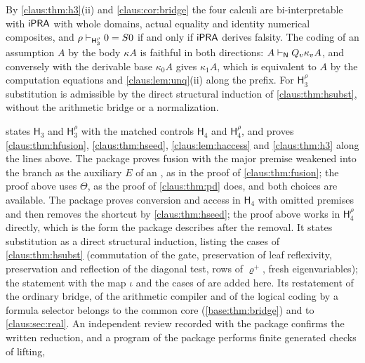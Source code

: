 By \cref{claus:thm:h3}(ii) and \cref{claus:cor:bridge} the four calculi
are bi-interpretable with $\mathsf{iPRA}$ with whole domains, actual equality and
identity numerical composites, and $\rho\vdash_{\mathsf{H}_3^{\rho}}0=S 0$
if and only if $\mathsf{iPRA}$ derives falsity. The coding of an assumption $A$ by
the body $\kappa A$ is faithful in both directions:
$A\vdash_{\mathsf{N}}Q_{v}\kappa_vA$, and conversely  with the
derivable base $\kappa_0A$ gives $\kappa_1A$, which is equivalent to $A$ by
the computation equations and \cref{claus:lem:unq}(ii) along the prefix.
For $\mathsf{H}_3^{\rho}$ substitution is admissible by the direct
structural induction of \cref{claus:thm:hsubst}, without the arithmetic
bridge or a normalization.

\begin{remark}
\label{claus:rem:hdpkgs}
 states $\mathsf{H}_3$ and
$\mathsf{H}_3^{\rho}$ with the matched controls $\mathsf{H}_4$ and
$\mathsf{H}_4^{\rho}$, and proves \cref{claus:thm:hfusion},
\cref{claus:thm:hseed}, \cref{claus:lem:haccess} and \cref{claus:thm:h3}
along the lines above. The package proves fusion with the major premise
weakened into the branch as the auxiliary $E$ of an , as in
the proof of \cref{claus:thm:fusion}; the proof above uses $\Theta$, as
the proof of \cref{claus:thm:pd} does, and both choices are available. The
package proves conversion and access in $\mathsf{H}_4$ with omitted
premises and then removes the shortcut by \cref{claus:thm:hseed}; the
proof above works in $\mathsf{H}_4^{\rho}$ directly, which is the form the
package describes after the removal. It states substitution as a direct
structural induction, listing the cases of \cref{claus:thm:hsubst}
(commutation of the gate, preservation of leaf reflexivity, preservation
and reflection of the diagonal test, rows of $\varrho^{+}$, fresh
eigenvariables); the statement with the map $\iota$ and the cases of
 are added here.
Its restatement of the ordinary bridge, of the arithmetic compiler and of
the logical coding by a formula selector belongs to the common core
(\cref{base:thm:bridge}) and to \cref{claus:sec:real}. An independent
review recorded with the package confirms the written reduction, and a
program of the package performs finite generated checks of lifting,

\end{remark}
